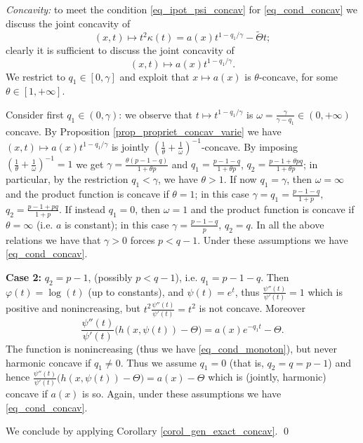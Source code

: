\documentclass[11pt, reqno]{amsart}
\theoremstyle{definition}
\numberwithin{equation}{section}
\renewenvironment{proof}[1][\proofname]{\medskip \noindent {\bfseries #1. }}{\qed \bigskip}
\begin{document}
\begin{proof}[Proof of Theorem \ref{thm_main_conc_exact}]
\medskip

\emph{Concavity:} to meet the condition \eqref{eq_ipot_psi_concav} for \eqref{eq_cond_concav} we discuss the joint concavity of
$$(x,t) \mapsto t^2 \kappa(t) = a(x) t^{1-q_1/\gamma} - \tilde{\Theta} t ;$$
clearly it is sufficient to discuss the joint concavity of 
$$(x,t) \mapsto a(x) t^{1-q_1/\gamma}.$$
We restrict to $q_1 \in [0, \gamma]$ and exploit that $x\mapsto a(x)$ is $\theta$-concave, for some $\theta \in [1,+\infty]$.

Consider first $q_1 \in (0, \gamma)$: we observe that $t \mapsto t^{1-q_1/\gamma}$ is $\omega = \frac{\gamma}{\gamma-q_1} \in (0, +\infty)$ concave. 
By Proposition \ref{prop_propriet_concav_varie} we have $(x,t) \mapsto a(x) t^{1-q_1/\gamma}$ is jointly $(\frac{1}{\theta} + \frac{1}{\omega})^{-1}$-concave.
By imposing $(\frac{1}{\theta} + \frac{1}{\omega})^{-1}=1$ we get $\gamma = \frac{\theta(p-1-q)}{1+ \theta p}$ and $q_1 = \frac{p-1-q}{1+\theta p}$, $ q_2 = \frac{p-1+ \theta p q}{1+\theta p}$; in particular, by the restriction $q_1 < \gamma$, we have $\theta>1$.
If now $q_1=\gamma$, then $\omega=\infty$ and the product function is concave if $\theta =1$; in this case $\gamma = q_1= \frac{p-1-q}{1+ p} ,$ $q_2 = \frac{p-1+pq}{1+p}$.
If instead $q_1=0$, then $\omega=1$ and the product function is concave if $\theta=\infty$ (i.e. $a$ is constant); in this case $\gamma = \frac{p-1-q}{p}$, $q_2=q$.
In all the above relations we have that $\gamma>0$ forces $p < q-1$.
Under these assumptions we have \eqref{eq_cond_concav}.

\smallskip

\textbf{Case 2:} $q_2 = p-1$, (possibly $p<q-1$), i.e. $q_1 = p-1-q$. Then $\varphi(t) = \log(t)$ (up to constants), and $\psi(t) = e^t$, thus $\frac{\psi''(t)}{\psi'(t)} = 1$ which is positive and nonincreasing, but $t^2 \frac{\psi''(t)}{\psi'(t)} = t^2$ is not concave.
Moreover
$$\frac{\psi''(t)}{\psi'(t)} \big(h(x,\psi(t))-\Theta \big) = a(x) e^{-q_1 t} - \Theta.$$
The function is nonincreasing (thus we have \eqref{eq_cond_monoton}), but never harmonic concave %
if $q_1 \neq 0$. 
Thus we assume $q_1=0$ (that is, $q_2=q=p-1$) and hence $\frac{\psi''(t)}{\psi'(t)} \big(h(x,\psi(t))-\Theta \big) = a(x) - \Theta$ which is (jointly, harmonic) concave if $a(x)$ is so.
Again, under these assumptions we have \eqref{eq_cond_concav}.


\smallskip

We conclude by applying Corollary \ref{corol_gen_exact_concav}. 
\end{proof}
\end{document}
